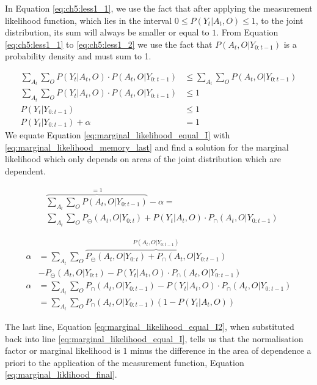In Equation \ref{eq:ch5:less1_1}, we use the fact that after applying the measurement likelihood function, which lies in the interval $0 \leq P(Y_t|A_t,O) \leq 1$, 
to the joint distribution, its sum will always be smaller or equal to $1$.
From Equation \ref{eq:ch5:less1_1} to \ref{eq:ch5:less1_2} we use the fact that $P(A_t,O|Y_{0:t-1})$ is a probability density and must sum to 1.

\begin{align}
  \sum\limits_{A_t}\sum\limits_{O} P(Y_t|A_t,O) \cdot P(A_t,O|Y_{0:t-1})  &\leq \sum\limits_{A_t}\sum\limits_{O} P(A_t,O|Y_{0:t-1}) \label{eq:ch5:less1_1}\\
  \sum\limits_{A_t}\sum\limits_{O} P(Y_t|A_t,O) \cdot P(A_t,O|Y_{0:t-1}) &\leq 1 \label{eq:ch5:less1_2} \\
  P(Y_t|Y_{0:t-1}) &\leq 1 \\
  P(Y_t|Y_{0:t-1}) + \alpha &= 1 \label{eq:marginal_likelihood_equal_I}
\end{align}
We equate Equation \ref{eq:marginal_likelihood_equal_I} with \ref{eq:marginal_likelihood_memory_last} and find a solution for the marginal likelihood which
only depends on areas of the joint distribution which are dependent.
		   
\begin{align}		  
 &\overbrace{\sum\limits_{A_t}\sum\limits_{O} P(A_t,O|Y_{0:t-1})}^{=1} - \alpha  = \nonumber \\ 
      &\sum\limits_{A_t}\sum\limits_{O} P_{\ominus}(A_t,O|Y_{0:t}) + P(Y_t|A_t,O)\cdot P_{\cap}(A_t,O|Y_{0:t-1})
\end{align}

\begin{align}   
   \alpha &= \sum\limits_{A_t}\sum\limits_{O}  \overbrace{P_{\ominus}(A_t,O|Y_{0:t}) + P_{\cap}(A_t,O|Y_{0:t-1})}^{P(A_t,O|Y_{0:t-1})}\nonumber\\ 
     & - P_{\ominus}(A_t,O|Y_{0:t}) - P(Y_t|A_t,O)\cdot P_{\cap}(A_t,O|Y_{0:t-1}) \\
    \alpha &= \sum\limits_{A_t}\sum\limits_{O} P_{\cap}(A_t,O|Y_{0:t-1}) - P(Y_t|A_t,O)\cdot P_{\cap}(A_t,O|Y_{0:t-1}) \\
	   &= \sum\limits_{A_t}\sum\limits_{O} P_{\cap}(A_t,O|Y_{0:t-1}) (1 - P(Y_t|A_t,O)) \label{eq:marginal_likelihood_equal_I2}
\end{align}

The last line, Equation \ref{eq:marginal_likelihood_equal_I2}, when substituted back into line \ref{eq:marginal_likelihood_equal_I}, tells us that the 
normalisation factor or marginal likelihood is $1$ minus the difference in the area of dependence a priori to the application of 
the measurement function, Equation \ref{eq:marginal_liklihood_final}.

